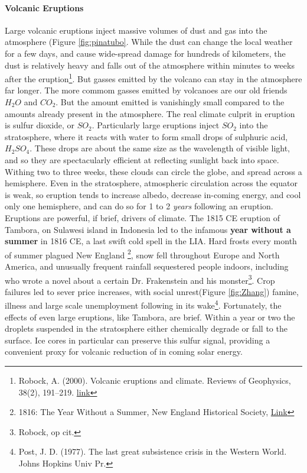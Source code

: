 \documentclass[amstex,12pt]{book}
\begin{document}
\paragraph{Volcanic Eruptions}
Large volcanic eruptions inject massive volumes of dust and gas into the atmosphere (Figure \ref{fig:pinatubo}. While the dust can change the local weather for a few days, and cause wide-spread damage for hundreds of kilometers, the dust is relatively heavy and falls out of the atmosphere within minutes to weeks after the eruption\footnote{Robock, A. (2000). Volcanic eruptions and climate. Reviews of Geophysics, 38(2), 191–219. \href{https://doi.org/10.1029/1998RG000054}{link}}. But gasses emitted by the volcano can stay in the atmosphere far longer. The more commom gasses emitted by volcanoes are our old friends $H_2O$ and $CO_2$. But the amount emitted is vanishingly small compared to the amounts already present in the atmosphere. The real climate culprit in eruption is sulfur dioxide, or $SO_2$. Particularly large eruptions inject $SO_2$ into the stratosphere, where it reacts with water to form small drops of sulphuric acid, $H_2SO_4$. These drops are about the same size as the wavelength of visible light, and so they are spectacularly efficient at reflecting sunlight back into space. Withing two to three weeks, these clouds can circle the globe, and spread across a hemisphere. Even in the stratosphere, atmospheric circulation across the equator is weak, so eruption tends to increase albedo, decrease in-coming energy, and cool only one hemisphere, and can do so for 1 to 2 \textit{years} following an eruption. Eruptions are powerful, if brief, drivers of climate. The 1815 CE eruption of Tambora, on Sulawesi island in Indonesia led to the infamous \textbf{year without a summer} in 1816 CE, a last swift cold spell in the LIA. Hard frosts every month of summer plagued New England \footnote{1816: The Year Without a Summer, New England Historical Society, \href{http://www.newenglandhistoricalsociety.com/1816-year-without-a-summer/}{Link}}, snow fell throughout Europe and North America, and unusually frequent rainfall sequestered people indoors, including who wrote a novel about a certain Dr. Frakenstein and his monster\footnote{Robock, op cit.}. Crop failures led to sever price increases, with social unrest(Figure \ref{fig:Zhang}) famine, illness and large scale unemployment following in its wake\footnote{Post, J. D. (1977). The last great subsistence crisis in the Western World. Johns Hopkins Univ Pr.}. Fortunately, the effects of even large eruptions, like Tambora, are brief. Within a year or two the droplets suspended in the stratosphere either chemically degrade or fall to the surface. Ice cores in particular can preserve this sulfur signal, providing a convenient proxy for volcanic reduction of in coming solar energy.\\
\end{document}
